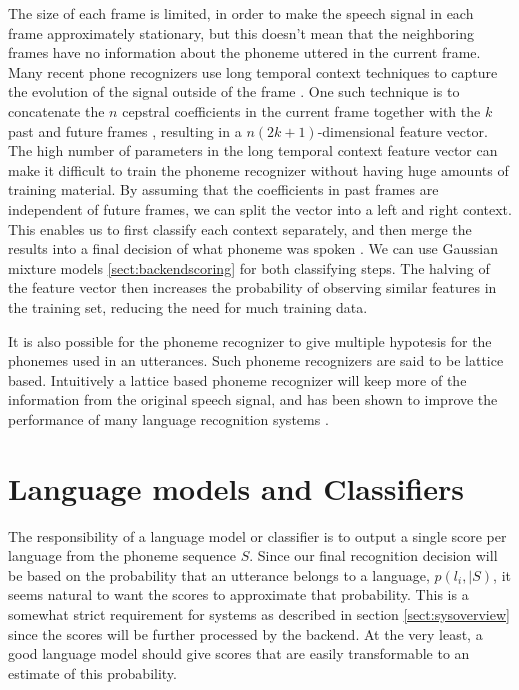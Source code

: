 The size of each frame is limited, in order to make the speech signal in each frame approximately stationary, but this doesn't mean that the neighboring frames have no information about the phoneme uttered in the current frame. Many recent phone recognizers use long temporal context techniques to capture the evolution of the signal outside of the frame \cite[p. 8]{butphnrec}. One such technique is to concatenate the $n$ cepstral coefficients in the current frame together with the $k$ past and future frames \cite[9]{butphnrec}, resulting in a $n(2k+1)$-dimensional feature vector. The high number of parameters in the long temporal context feature vector can make it difficult to train the phoneme recognizer without having huge amounts of training material. By assuming that the coefficients in past frames are independent of future frames, we can split the vector into a left and right context. This enables us to first classify each context separately, and then merge the results into a final decision of what phoneme was spoken \cite[p. 36]{butphnrec}. We can use Gaussian mixture models \ref{sect:backendscoring} for both classifying steps. The halving of the feature vector then increases the probability of observing similar features in the training set, reducing the need for much training data.

It is also possible for the phoneme recognizer to give multiple hypotesis for the phonemes used in an utterances. Such phoneme recognizers are said to be lattice based. Intuitively a lattice based phoneme recognizer will keep more of the information from the original speech signal, and has been shown to improve the performance of many language recognition systems \cite[p. 818]{lidbok}.


\section{Language models and Classifiers}
\label{sect:basiclangmodel}

The responsibility of a language model or classifier is to output a single score per language from the phoneme sequence $S$. Since our final recognition decision will be based on the probability that an utterance belongs to a language, $p(l_i, | S)$, it seems natural to want the scores to approximate that probability. This is a somewhat strict requirement for systems as described in section \ref{sect:sysoverview} since the scores will be further processed by the backend. At the very least, a good language model should give scores that are easily transformable to an estimate of this probability. 

